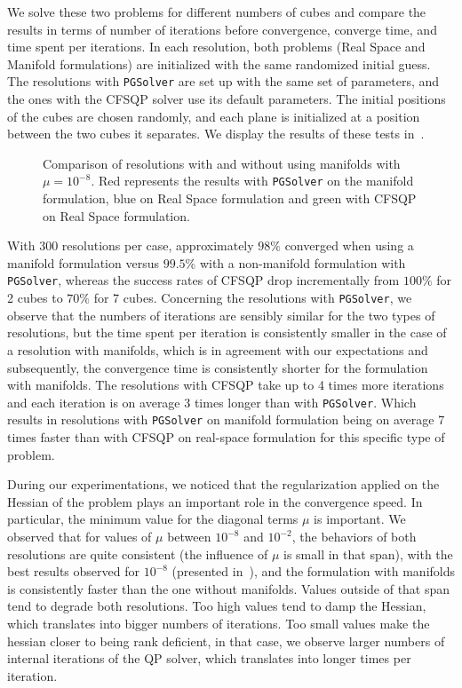 We solve these two problems for different numbers of cubes and compare the results in terms of number of iterations before convergence, converge time, and time spent per iterations.
In each resolution, both problems (Real Space and Manifold formulations) are initialized with the same randomized initial guess.
The resolutions with {\tt PGSolver} are set up with the same set of parameters, and the ones with the CFSQP solver use its default parameters.
The initial positions of the cubes are chosen randomly, and each plane is initialized at a position between the two cubes it separates.
We display the results of these tests in~.
\begin{figure}[htpb]
  \centering
  
  \caption{Comparison of resolutions with and without using manifolds with $\mu=10^{-8}$. Red represents the results with {\tt PGSolver} on the manifold formulation, blue on Real Space formulation and green with CFSQP on Real Space formulation.}
\label{fig:timings-cubes}
\end{figure}

With 300 resolutions per case, approximately $98\%$ converged when using a manifold formulation versus $99.5\%$ with a non-manifold formulation with {\tt PGSolver}, whereas the success rates of CFSQP drop incrementally from $100\%$ for 2 cubes to $70\%$ for 7 cubes.
Concerning the resolutions with {\tt PGSolver}, we observe that the numbers of iterations are sensibly similar for the two types of resolutions, but the time spent per iteration is consistently smaller in the case of a resolution with manifolds, which is in agreement with our expectations and subsequently, the convergence time is consistently shorter for the formulation with manifolds.
The resolutions with CFSQP take up to 4 times more iterations and each iteration is on average 3 times longer than with {\tt PGSolver}.
Which results in resolutions with {\tt PGSolver} on manifold formulation being on average 7 times faster than with CFSQP on real-space formulation for this specific type of problem.

During our experimentations, we noticed that the regularization applied on the Hessian of the problem plays an important role in the convergence speed.
In particular, the minimum value for the diagonal terms $\mu$ is important.
We observed that for values of $\mu$ between $10^{-8}$ and $10^{-2}$, the behaviors of both resolutions are quite consistent (the influence of $\mu$ is small in that span), with the best results observed for $10^{-8}$ (presented in~), and the formulation with manifolds is consistently faster than the one without manifolds.
Values outside of that span tend to degrade both resolutions.
Too high values tend to damp the Hessian, which translates into bigger numbers of iterations.
Too small values make the hessian closer to being rank deficient, in that case, we observe larger numbers of internal iterations of the QP solver, which translates into longer times per iteration.

